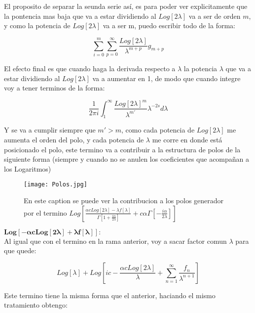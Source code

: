 El proposito de separar la seunda serie así, es para poder ver explicitamente que la pontencia mas baja que va a estar dividiendo al $Log[2 \lambda] $ va a ser de orden $m$, y como la potencia de $Log[2 \lambda]$ va a ser m, puedo escribir todo de la forma:

\begin{equation}
\sum _{i=0} ^m \sum _{p=0} ^{\infty} \frac{Log[2 \lambda]}{\lambda ^{m+p}} g _{m+p}
\end{equation}


El efecto final es que cuando haga la derivada respecto a $\lambda$ la potencia $\lambda$ que va a estar dividiendo al $Log[2 \lambda]$ va a aumentar en 1, de modo que cuando integre voy a tener terminos de la forma:

\begin{equation}
\frac{1}{2 \pi i} 
\int _{1} ^{\infty} \frac{Log[2 \lambda] ^{m}}{\lambda ^{m'}} \lambda ^{-2s} d \lambda
\end{equation}

Y se va a cumplir siempre que $m'> m$, como cada potencia de $Log[2 \lambda]$ me aumenta el orden del polo, y cada potencia de $\lambda$ me corre en donde está posicionado el polo, este termino va a contribuir a la estructura de polos de la siguiente forma (siempre y cuando no se anulen los coeficientes que acompañan a los Logaritmos)

\begin{figure}
    \centering
    \texttt{[image: Polos.jpg]}
    \caption{En este caption se puede ver la contribucion a los polos generador por el termino $Log[
	\frac{\alpha c Log[2 \lambda] - \lambda f[\lambda] }{\Gamma \left[1 + \frac{i \alpha}{ 2 \lambda} \right] } + 
	c \alpha \Gamma \left[ - \frac{i \alpha}{2 \lambda} \right] ]$ }
    \label{fig:Dibujo}
\end{figure}

$\mathbf{
		Log[- \alpha c Log[2 \lambda] + \lambda f[\lambda] ]
		}: 
		$ \\

Al igual que con el termino en la rama anterior, voy a sacar factor comun $\lambda$ para que quede:

\begin{equation}
Log[\lambda] + 
Log[i c - \frac{\alpha c Log[2 \lambda] }{\lambda} + 
\sum _{n=1} ^{\infty} \frac{f _n}{\lambda ^{n+1}} ]
\end{equation}

Este termino tiene la misma forma que el anterior, haciando el mismo tratamiento obtengo:

